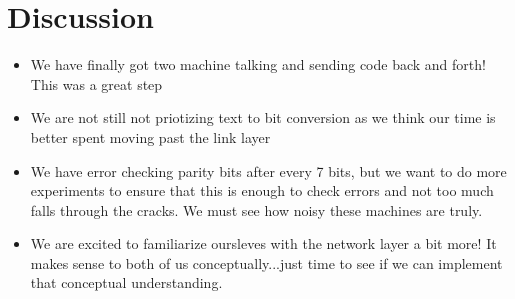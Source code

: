 \documentclass{article}
\begin{document}
\section*{Discussion}
\begin{itemize}
\item We have finally got two machine talking and sending code back and forth! This was a great step
\item We are not still not priotizing text to bit conversion as we think our time is better spent moving past the link layer
\item We have error checking parity bits after every 7 bits, but we want to do more experiments to ensure that this is enough to check errors and not too much falls through the cracks. We must see how noisy these machines are truly. 
\item We are excited to familiarize oursleves with the network layer a bit more! It makes sense to both of us conceptually...just time to see if we can implement that conceptual understanding.
\end{itemize}
\end{document}
